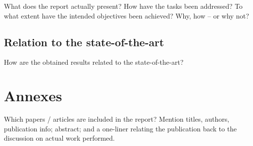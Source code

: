 \documentclass[a4paper,11pt,pdf]{pacmanreport}
\begin{document}
What does the report actually present? How have the tasks been addressed? To what extent have the intended objectives been achieved? Why, how -- or why not?

\subsection{Relation to the state-of-the-art}

How are the obtained results related to the state-of-the-art?

\section{Annexes}

Which papers / articles are included in the report? Mention titles, authors, publication info; abstract; and a one-liner relating the publication back to the discussion on actual work performed.

%
%
\end{document}
